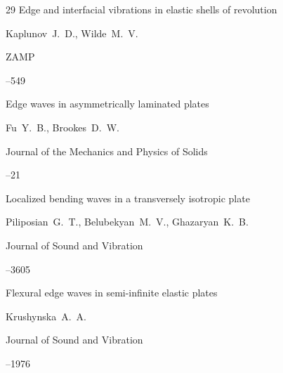 \begin{thebibliography}{29}
\paper Edge and interfacial vibrations in elastic shells of revolution

\by Kaplunov~J.~D., Wilde~M.~V.

\jour ZAMP



--549






\paper Edge waves in asymmetrically laminated plates

\by Fu~Y.~B., Brookes~D.~W.

\jour Journal of the Mechanics and Physics of Solids




--21





\paper Localized bending waves in a transversely isotropic plate

\by Piliposian~G.~T., Belubekyan~M.~V., Ghazaryan~K.~B.

\jour Journal of Sound and Vibration




–3605





\paper Flexural edge waves in semi-infinite elastic plates

\by Krushynska~A.~A.

\jour Journal of Sound and Vibration




–1976






\end{thebibliography}
